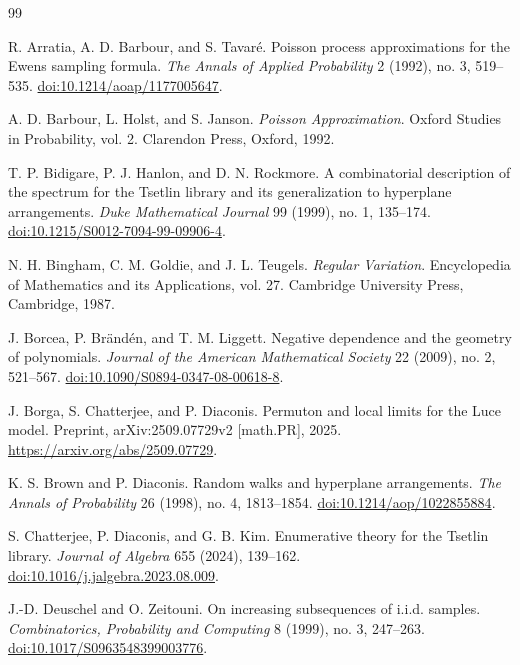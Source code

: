 \documentclass[11pt]{article}
\theoremstyle{remark}
\begin{document}
\begin{thebibliography}{99}

R. Arratia, A. D. Barbour, and S. Tavar\'e.
\newblock Poisson process approximations for the Ewens sampling formula.
\newblock \emph{The Annals of Applied Probability} 2 (1992), no. 3, 519--535.
\newblock \href{https://doi.org/10.1214/aoap/1177005647}
{doi:10.1214/aoap/1177005647}.

A. D. Barbour, L. Holst, and S. Janson.
\newblock \emph{Poisson Approximation}.
\newblock Oxford Studies in Probability, vol. 2.
\newblock Clarendon Press, Oxford, 1992.

T. P. Bidigare, P. J. Hanlon, and D. N. Rockmore.
\newblock A combinatorial description of the spectrum for the Tsetlin library
and its generalization to hyperplane arrangements.
\newblock \emph{Duke Mathematical Journal} 99 (1999), no. 1, 135--174.
\newblock \href{https://doi.org/10.1215/S0012-7094-99-09906-4}
{doi:10.1215/S0012-7094-99-09906-4}.

N. H. Bingham, C. M. Goldie, and J. L. Teugels.
\newblock \emph{Regular Variation}.
\newblock Encyclopedia of Mathematics and its Applications, vol. 27.
\newblock Cambridge University Press, Cambridge, 1987.

J. Borcea, P. Br\"and\'en, and T. M. Liggett.
\newblock Negative dependence and the geometry of polynomials.
\newblock \emph{Journal of the American Mathematical Society} 22 (2009),
no. 2, 521--567.
\newblock \href{https://doi.org/10.1090/S0894-0347-08-00618-8}
{doi:10.1090/S0894-0347-08-00618-8}.

J. Borga, S. Chatterjee, and P. Diaconis.
\newblock Permuton and local limits for the Luce model.
\newblock Preprint, arXiv:2509.07729v2 [math.PR], 2025.
\newblock \url{https://arxiv.org/abs/2509.07729}.

K. S. Brown and P. Diaconis.
\newblock Random walks and hyperplane arrangements.
\newblock \emph{The Annals of Probability} 26 (1998), no. 4, 1813--1854.
\newblock \href{https://doi.org/10.1214/aop/1022855884}
{doi:10.1214/aop/1022855884}.

S. Chatterjee, P. Diaconis, and G. B. Kim.
\newblock Enumerative theory for the Tsetlin library.
\newblock \emph{Journal of Algebra} 655 (2024), 139--162.
\newblock \href{https://doi.org/10.1016/j.jalgebra.2023.08.009}{doi:10.1016/j.jalgebra.2023.08.009}.

J.-D. Deuschel and O. Zeitouni.
\newblock On increasing subsequences of i.i.d. samples.
\newblock \emph{Combinatorics, Probability and Computing} 8 (1999), no. 3,
247--263.
\newblock \href{https://doi.org/10.1017/S0963548399003776}
{doi:10.1017/S0963548399003776}.


\end{thebibliography}
\end{document}
